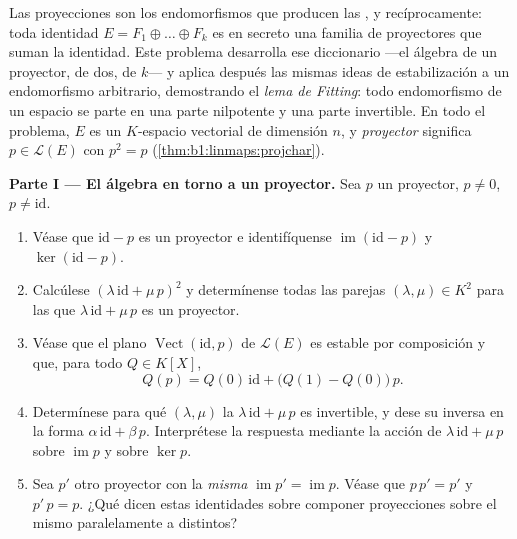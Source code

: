 \begin{problem}\label{pb:b1:linmaps:1}
Las proyecciones son los endomorfismos que producen las , y recíprocamente: toda identidad
$E = F_1 \oplus \dots \oplus F_k$ es en secreto una familia de
proyectores que suman la identidad. Este problema desarrolla ese
diccionario ---el álgebra de un proyector, de dos, de $k$--- y aplica
después las mismas ideas de estabilización a un endomorfismo
arbitrario, demostrando el \emph{lema de Fitting}: todo endomorfismo
de un espacio  se parte en una parte nilpotente y
una parte invertible. En todo el problema, $E$ es un $K$-espacio
vectorial de dimensión $n$, y \emph{proyector} significa
$p \in \mathcal{L}(E)$ con $p^2 = p$
(\cref{thm:b1:linmaps:projchar}).

\medskip
\noindent\textbf{Parte I --- El álgebra en torno a un proyector.}
Sea $p$ un proyector, $p \neq 0$, $p \neq \mathrm{id}$.
\begin{enumerate}
  \item Véase que $\mathrm{id} - p$ es un proyector e identifíquense
        $\operatorname{im}(\mathrm{id} - p)$ y
        $\ker(\mathrm{id} - p)$.
  \item Calcúlese $(\lambda\,\mathrm{id} + \mu\,p)^2$ y
        determínense todas las parejas $(\lambda, \mu) \in K^2$ para
        las que $\lambda\,\mathrm{id} + \mu\,p$ es un proyector.
  \item Véase que el plano $\operatorname{Vect}(\mathrm{id}, p)$ de
        $\mathcal{L}(E)$ es estable por composición y que, para todo
         $Q \in K[X]$,
        \[
        Q(p) = Q(0)\,\mathrm{id} + \bigl(Q(1) -
        Q(0)\bigr)\,p .
        \]
  \item Determínese para qué $(\lambda, \mu)$ la 
        $\lambda\,\mathrm{id} + \mu\,p$ es invertible, y dese su
        inversa en la forma $\alpha\,\mathrm{id} + \beta\,p$.
        Interprétese la respuesta mediante la acción de
        $\lambda\,\mathrm{id} + \mu\,p$ sobre $\operatorname{im} p$ y
        sobre $\ker p$.
  \item Sea $p'$ otro proyector con la \emph{misma }
        $\operatorname{im} p' = \operatorname{im} p$. Véase que
        $p\,p' = p'$ y $p'\,p = p$. ¿Qué dicen estas identidades
        sobre componer proyecciones sobre el mismo 
        paralelamente a  distintos?
\end{enumerate}


\end{problem}
